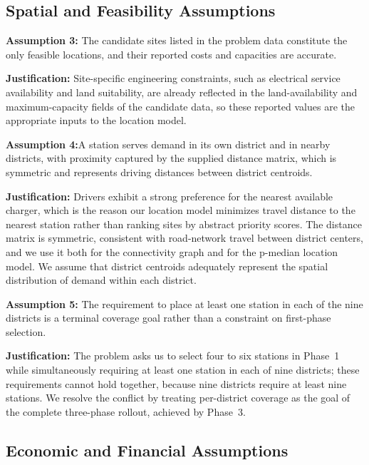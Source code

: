 \documentclass[11pt]{article}
\begin{document}
\subsection{Spatial and Feasibility Assumptions}

\textbf{Assumption 3:} The candidate sites listed in the problem data constitute the only feasible locations, and their reported costs and capacities are accurate.

\textbf{Justification:} Site-specific engineering constraints, such as electrical service availability and land suitability, are already reflected in the land-availability and maximum-capacity fields of the candidate data, so these reported values are the appropriate inputs to the location model.

\vspace{0.5em}
\textbf{Assumption 4:}A station serves demand in its own district and in nearby districts, with proximity captured by the supplied distance matrix, which is symmetric and represents driving distances between district centroids.



\textbf{Justification:} Drivers exhibit a strong preference for the nearest available charger, which is the reason our location model minimizes travel distance to the nearest station rather than ranking sites by abstract priority scores. The distance matrix is symmetric, consistent with road-network travel between district centers, and we use it both for the connectivity graph and for the p-median location model. We assume that district centroids adequately represent the spatial distribution of demand within each district.

\vspace{0.5em}
\textbf{Assumption 5:} The requirement to place at least one station in each of the nine districts is a terminal coverage goal rather than a constraint on first-phase selection.

\textbf{Justification:} The problem asks us to select four to six stations in Phase~1 while simultaneously requiring at least one station in each of nine districts; these requirements cannot hold together, because nine districts require at least nine stations. We resolve the conflict by treating per-district coverage as the goal of the complete three-phase rollout, achieved by Phase~3.

\subsection{Economic and Financial Assumptions}
\end{document}
